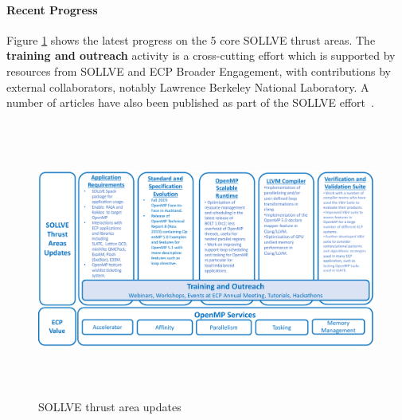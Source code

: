 \paragraph{Recent Progress}
Figure \ref{fig:sollve-update} shows the latest progress on the 5 core SOLLVE
thrust areas. The {\bf training and outreach} activity is a
cross-cutting effort which is supported by resources from SOLLVE and  ECP Broader Engagement,
 with contributions by external collaborators, notably Lawrence Berkeley National
Laboratory.   
A number of articles have also been published
as part of the SOLLVE
effort~\cite{openmp-tr6,zinenko.cc.2018,vandv2019,
tregion, Mishra:2019:KFA:3314872.3314915,
udm, loopTransPragmas, DBLP:conf/iwomp/SreenivasanJHBS19,
DBLP:conf/iwomp/ScoglandSOHES19, DBLP:conf/iwomp/0001WLSS19,
DBLP:conf/iwomp/KaleIKKC19, Bak2019OptimizedEO, lsrt, boltPACT19}.



\begin{figure}[t]
\includegraphics[width=1.0\linewidth,height=9.1cm]{SOLLVE-progress}
\caption{\label{fig:sollve-update}SOLLVE thrust area updates}
\end{figure}

